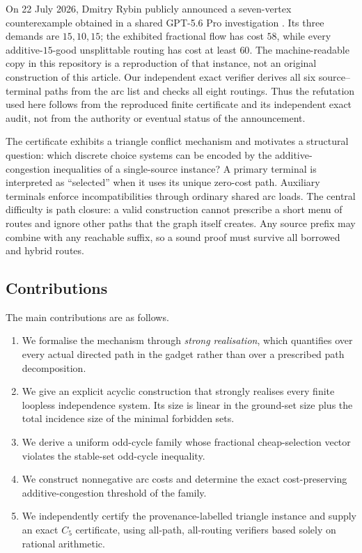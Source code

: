 \documentclass[11pt]{article}
\theoremstyle{definition}
\begin{document}
On 22 July 2026, Dmitry Rybin publicly announced a seven-vertex counterexample obtained in a shared GPT-5.6 Pro investigation \cite{rybin2026,rybintranscript2026}. Its three demands are \(15,10,15\); the exhibited fractional flow has cost \(58\), while every additive-\(15\)-good unsplittable routing has cost at least \(60\). The machine-readable copy in this repository is a reproduction of that instance, not an original construction of this article. Our independent exact verifier derives all six source--terminal paths from the arc list and checks all eight routings. Thus the refutation used here follows from the reproduced finite certificate and its independent exact audit, not from the authority or eventual status of the announcement.

The certificate exhibits a triangle conflict mechanism and motivates a structural question: which discrete choice systems can be encoded by the additive-congestion inequalities of a single-source instance? A primary terminal is interpreted as ``selected'' when it uses its unique zero-cost path. Auxiliary terminals enforce incompatibilities through ordinary shared arc loads. The central difficulty is path closure: a valid construction cannot prescribe a short menu of routes and ignore other paths that the graph itself creates. Any source prefix may combine with any reachable suffix, so a sound proof must survive all borrowed and hybrid routes.

\subsection{Contributions}

The main contributions are as follows.

\begin{enumerate}
  \item We formalise the mechanism through \emph{strong realisation}, which quantifies over every actual directed path in the gadget rather than over a prescribed path decomposition.
  \item We give an explicit acyclic construction that strongly realises every finite loopless independence system. Its size is linear in the ground-set size plus the total incidence size of the minimal forbidden sets.
  \item We derive a uniform odd-cycle family whose fractional cheap-selection vector violates the stable-set odd-cycle inequality.
  \item We construct nonnegative arc costs and determine the exact cost-preserving additive-congestion threshold of the family.
  \item We independently certify the provenance-labelled triangle instance and supply an exact \(C_5\) certificate, using all-path, all-routing verifiers based solely on rational arithmetic.
\end{enumerate}
\end{document}
